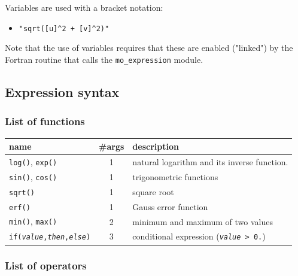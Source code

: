 Variables are used with a bracket notation:
\begin{itemize}
 \item \verb;"sqrt([u]^2 + [v]^2)";
\end{itemize}
Note that the use of variables requires that these are enabled
("linked") by the Fortran routine that calls the
\texttt{mo\_expression} module.


\subsection{Expression syntax}

\subsubsection{List of functions}

\begin{tabular}{|l|c|p{7cm}|}
  \hline
  name                           & \#args & description \\
  \hline\hline
  \texttt{log()}, \texttt{exp()} & 1                & natural logarithm and its inverse function. \\
  \texttt{sin()}, \texttt{cos()} & 1                & trigonometric functions                     \\
  \texttt{sqrt()}                & 1                & square root                                 \\
  \texttt{erf()}                 & 1                & Gauss error function                        \\
  \texttt{min()}, \texttt{max()} & 2                & minimum and maximum of two values           \\
  \texttt{if(\textit{value},\textit{then},\textit{else})} & 3 & conditional expression
                                                      (\texttt{\textit{value} > 0.})              \\
  \hline
\end{tabular}


\subsubsection{List of operators}

